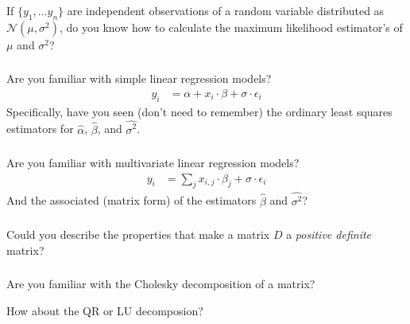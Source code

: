 \begin{frame}[fragile] \frametitle{}

If $\{y_1, \ldots y_n \}$ are independent observations of
a random variable distributed as $\mathcal{N}(\mu, \sigma^2)$,
do you know how to calculate the maximum likelihood estimator's
of $\mu$ and $\sigma^2$?

\end{frame}

\begin{frame}[fragile] \frametitle{}

Are you familiar with simple linear regression models?
\begin{align*}
y_i &= \alpha + x_i \cdot \beta + \sigma \cdot \epsilon_i
\end{align*}
\pause Specifically, have you seen (don't need to remember)
the ordinary least squares estimators for $\widehat{\alpha}$,
$\widehat{\beta}$, and $\widehat{\sigma^2}$.

\end{frame}

\begin{frame}[fragile] \frametitle{}

Are you familiar with multivariate linear regression models?
\begin{align*}
y_i &= \sum_j x_{i,j} \cdot \beta_j + \sigma \cdot \epsilon_i
\end{align*}
And the associated (matrix form) of the estimators $\widehat{\beta}$ and
$\widehat{\sigma^2}$?

\end{frame}

\begin{frame}[fragile] \frametitle{}

Could you describe the properties that make a matrix
$D$ a {\it positive definite} matrix?

\end{frame}

\begin{frame}[fragile] \frametitle{}

Are you familiar with the Cholesky decomposition of a matrix?

\pause How about the QR or LU decomposion?


\end{frame}


